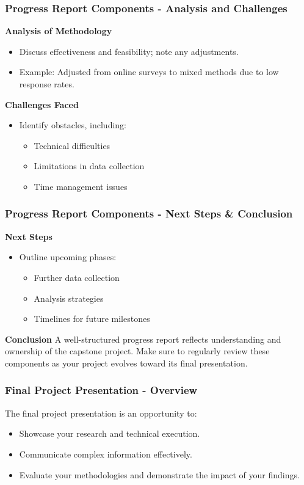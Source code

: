\documentclass[aspectratio=169]{beamer}
\begin{document}
\begin{frame}[fragile]
    \frametitle{Progress Report Components - Analysis and Challenges}
    \textbf{Analysis of Methodology}
    \begin{itemize}
        \item Discuss effectiveness and feasibility; note any adjustments.
        \item Example: Adjusted from online surveys to mixed methods due to low response rates.
    \end{itemize}
    
    \textbf{Challenges Faced}
    \begin{itemize}
        \item Identify obstacles, including:
        \begin{itemize}
            \item Technical difficulties
            \item Limitations in data collection
            \item Time management issues
        \end{itemize}
    \end{itemize}
\end{frame}

\begin{frame}[fragile]
    \frametitle{Progress Report Components - Next Steps & Conclusion}
    \textbf{Next Steps}
    \begin{itemize}
        \item Outline upcoming phases:
        \begin{itemize}
            \item Further data collection
            \item Analysis strategies
            \item Timelines for future milestones
        \end{itemize}
    \end{itemize}
    
    \textbf{Conclusion}
    A well-structured progress report reflects understanding and ownership of the capstone project. Make sure to regularly review these components as your project evolves toward its final presentation.
\end{frame}

\begin{frame}[fragile]
    \frametitle{Final Project Presentation - Overview}
    The final project presentation is an opportunity to:
    \begin{itemize}
        \item Showcase your research and technical execution.
        \item Communicate complex information effectively.
        \item Evaluate your methodologies and demonstrate the impact of your findings.
    \end{itemize}
\end{frame}
\end{document}
